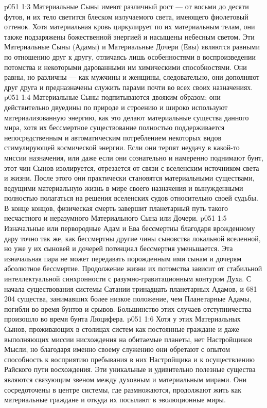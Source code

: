 \vs p051 1:3 \pc Материальные Сыны имеют различный рост --- от восьми до десяти футов, и их тело светится блеском излучаемого света, имеющего фиолетовый оттенок. Хотя материальная кровь циркулирует по их материальным телам, они также подзаряжены божественной энергией и насыщены небесным светом. Эти Материальные Сыны (Адамы) и Материальные Дочери (Евы) являются равными по отношению друг к другу, отличаясь лишь особенностями в воспроизведении потомства и некоторыми дарованными им химическими способностями. Они равны, но различны --- как мужчины и женщины, следовательно, они дополняют друг друга и предназначены служить парами почти во всех своих назначениях.
\vs p051 1:4 Материальные Сыны подпитываются двояким образом; они действительно двуедины по природе и строению и широко используют материализованную энергию, как это делают материальные существа данного мира, хотя их бессмертное существование полностью поддерживается непосредственным и автоматическим потреблением некоторых видов стимулирующей космической энергии. Если они терпят неудачу в какой\hyp{}то миссии назначения, или даже если они сознательно и намеренно поднимают бунт, этот чин Сынов изолируется, отрезается от связи с вселенским источником света и жизни. После этого они практически становятся материальными существами, ведущими материальную жизнь в мире своего назначения и вынужденными полностью полагаться на решения вселенских судов относительно своей судьбы. В конце концов, физическая смерть завершит планетарный путь такого несчастного и неразумного Материального Сына или Дочери.
\vs p051 1:5 Изначальные или первородные Адам и Ева бессмертны благодаря врожденному дару точно так же, как бессмертны другие чины сыновства локальной вселенной, но уже у их сыновей и дочерей потенциал бессмертия уменьшается. Эта изначальная пара не может передавать порожденным ими сынам и дочерям абсолютное бессмертие. Продолжение жизни их потомства зависит от стабильной интеллектуальной синхронности с разумно\hyp{}гравитационным контуром Духа. С начала существования системы Сатании тринадцать планетарных Адамов, и 681\,204 существа, занимавших более низкое положение, чем Планетарные Адамы, погибли во время бунтов и срывов. Большинство этих случаев отступничества произошло во время бунта Люцифера.
\vs p051 1:6 \pc Хотя у этих Материальных Сынов, проживающих в столицах систем как постоянные граждане и даже выполняющих миссии нисхождения на обитаемые планеты, нет Настройщиков Мысли, но благодаря именно своему служению они обретают с опытом способность к восприятию пребывания в них Настройщика и к осуществлению Райского пути восхождения. Эти уникальные и удивительно полезные существа являются связующим звеном между духовным и материальным мирами. Они сосредоточены в центре системы, где размножаются, продолжают жить как материальные граждане и откуда их посылают в эволюционные миры.
